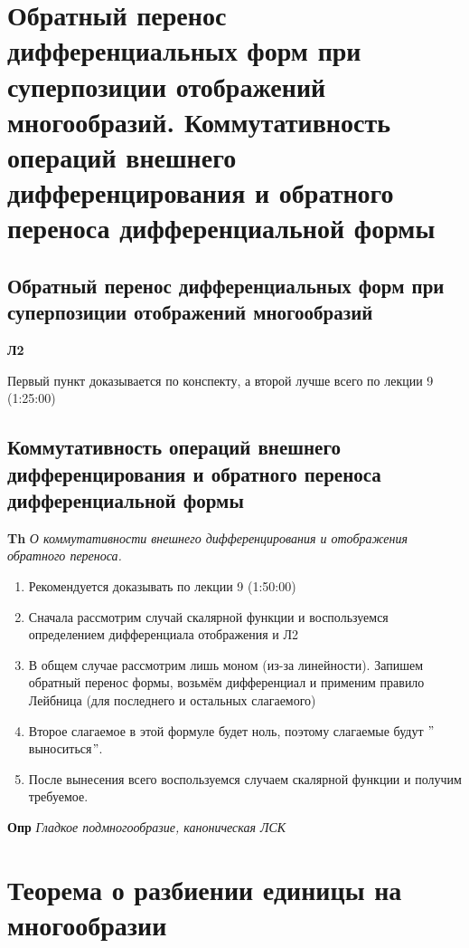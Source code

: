 \documentclass[a4paper, 14pt]{article}
\begin{document}
    \section{Обратный перенос дифференциальных форм при суперпозиции отображений многообразий.
    Коммутативность операций внешнего дифференцирования и обратного переноса дифференциальной формы}
    
    \subsection{Обратный перенос дифференциальных форм при суперпозиции отображений многообразий}
    
    \textbf{Л2}
    
    Первый пункт доказывается по конспекту, а второй лучше всего по лекции 9 (1:25:00)
    
    \subsection{Коммутативность операций внешнего дифференцирования и обратного переноса дифференциальной формы}
    
    \textbf{Th} \textit{О коммутативности внешнего дифференцирования и отображения обратного переноса.}
    
    \begin{enumerate}
        \item Рекомендуется доказывать по лекции 9 (1:50:00)
        \item Сначала рассмотрим случай скалярной функции и воспользуемся определением дифференциала отображения и Л2
        \item В общем случае рассмотрим лишь моном (из-за линейности).
        Запишем обратный перенос формы, возьмём дифференциал и применим правило Лейбница (для последнего и остальных
        слагаемого)
        \item Второе слагаемое в этой формуле будет ноль, поэтому слагаемые будут \("\)выноситься\("\).
        \item После вынесения всего воспользуемся случаем скалярной функции и получим требуемое.
    \end{enumerate}
    
    \textbf{Опр} \textit{Гладкое подмногообразие, каноническая ЛСК}
    
    \section{Теорема о разбиении единицы на многообразии}
    
\end{document}
